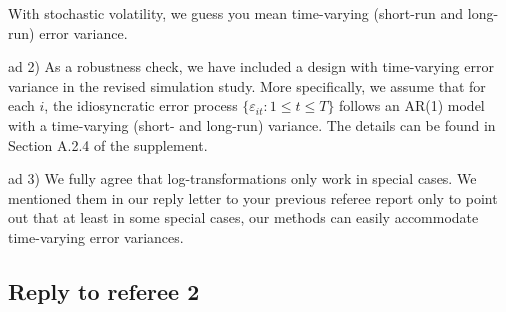 \documentclass[a4paper,12pt]{article}
\begin{document}
\begin{enumerate}[label=\arabic*.,leftmargin=0.6cm]
With stochastic volatility, we guess you mean time-varying (short-run and long-run) error variance.

ad 2) As a robustness check, we have included a design with time-varying error variance in the revised simulation study. More specifically, we assume that for each $i$, the idiosyncratic error process $\{\varepsilon_{it}: 1 \le t \le T\}$ follows an AR(1) model with a time-varying (short- and long-run) variance. The details can be found in Section A.2.4 of the supplement. 


ad 3) We fully agree that log-transformations only work in special cases. We mentioned them in our reply letter to your previous referee report only to point out that at least in some special cases, our methods can easily accommodate time-varying error variances. 


\end{enumerate}



\subsection*{Reply to referee 2}
\end{document}
